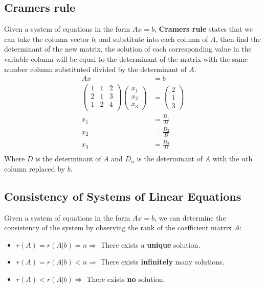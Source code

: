 \documentclass[a4paper]{article}
\begin{document}
  \subsection{Cramer\textquotesingle s rule}
  Given a system of equations in the form $Ax=b$, \textbf{Cramer\textquotesingle s rule} states that we can take the column vector $b$, and substitute into each column of $A$, then find the determinant of the new matrix, the solution of each corresponding value in the variable column will be equal to the determinant of the matrix with the same number column substituted divided by the determinant of $A$.
  \begin{equation}
    \begin{aligned}
      Ax&=b \\
      \begin{pmatrix}
        1 & 1 & 2 \\ 
        2 & 1 & 3 \\ 
        1 & 2 & 4 \\ 
      \end{pmatrix}
      \begin{pmatrix}
       x_1 \\ x_2 \\ x_3 
     \end{pmatrix}&=
     \begin{pmatrix}
     2 \\ 1 \\ 3 
     \end{pmatrix}\\
      x_1 &= \displaystyle\frac{D_1}{D}\\
      x_2 &= \displaystyle\frac{D_2}{D}\\
      x_3 &= \displaystyle\frac{D_3}{D}\\
    \end{aligned}
  \end{equation}
  Where $D$ is the determinant of $A$ and $D_n$ is the determinant of $A$ with the $n$th column replaced by $b$.
  \subsection{Consistency of Systems of Linear Equations}
  Given a system of equations in the form $Ax = b$, we can determine the consistency of the system by observing the rank of the coefficient matrix $A$:
  \begin{itemize}
    \item $r(A) = r(A|b) = n \Rightarrow$ There exists a \textbf{unique} solution.
    \item $r(A) = r(A|b) < n \Rightarrow$ There exists \textbf{infinitely} many solutions.
    \item $r(A) < r(A|b) \Rightarrow$ There exists \textbf{no} solution.
  \end{itemize}
\end{document}
